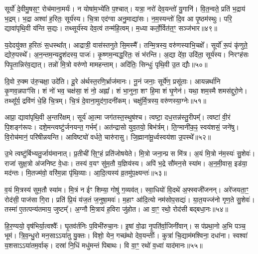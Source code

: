 सूर्यो॑ दे॒वीमु॒षस॒ꣳ॒ रोच॑माना॒मर्यः॑।
न योषा॑म॒भ्ये॑ति प॒श्चात्।
यत्रा॒ नरो॑ देव॒यन्तो॑ यु॒गानि॑।
वि॒त॒न्वते॒ प्रति॑ भ॒द्राय॑ भ॒द्रम्।
भ॒द्रा अश्वा॑ ह॒रितः॒ सूर्य॑स्य।
चि॒त्रा एद॑ग्वा अनु॒माद्या॑सः।
न॒म॒स्यन्तो॑ दि॒व आ पृ॒ष्ठम॑स्थुः।
परि॒ द्यावा॑पृथि॒वी य॑न्ति स॒द्यः।
तथ्सूर्य॑स्य देव॒त्वं तन्म॑हि॒त्वम्।
म॒ध्या कर्तो॒र्वित॑त॒ꣳ॒ सञ्ज॑भार॥४९॥

य॒देदयु॑क्त ह॒रितः॑ स॒धस्था᳚त्।
आद्रात्री॒ वास॑स्तनुते सि॒मस्मै᳚।
तन्मि॒त्रस्य॒ वरु॑णस्याभि॒चक्षे᳚।
सूर्यो॑ रू॒पं कृ॑णुते॒ द्योरु॒पस्थे᳚।
अ॒न॒न्तम॒न्यद्रुश॑दस्य॒ पाजः॑।
कृ॒ष्णम॒न्यद्ध॒रितः॒ सं भ॑रन्ति।
अ॒द्या दे॑वा॒ उदि॑ता॒ सूर्य॑स्य।
निरꣳह॑सः पिपृ॒तान्निर॑व॒द्यात्।
तन्नो॑ मि॒त्रो वरु॑णो मामहन्ताम्।
अदि॑तिः॒ सिन्धुः॑ पृथि॒वी उ॒त द्यौः॥५०॥

दि॒वो रु॒क्म उ॑रु॒चक्षा॒ उदे॑ति।
दू॒रे अ॑र्थस्त॒रणि॒र्भ्राज॑मानः।
नू॒नं जनाः॒ सूर्ये॑ण॒ प्रसू॑ताः।
आयन्नर्था॑नि कृ॒णव॒न्नपाꣳ॑सि।
शं नो॑ भव॒ चक्ष॑सा॒ शं नो॒ अह्ना᳚।
शं भा॒नुना॒ शꣳ हि॒मा शं घृ॒णेन॑।
यथा॒ शम॒स्मै शमस॑द्दुरो॒णे।
तथ्सू᳚र्य॒ द्रवि॑णं धे॒हि चि॒त्रम्।
चि॒त्रं दे॒वाना॒मुद॑गा॒दनी॑कम्।
चक्षु॑र्मि॒त्रस्य॒ वरु॑णस्या॒ग्नेः॥५१॥

आप्रा॒ द्यावा॑पृथि॒वी अ॒न्तरि॑क्षम्।
सूर्य॑ आ॒त्मा जग॑तस्त॒स्थुष॑श्च।
त्वष्टा॒ दध॒त्तन्न॑स्तु॒रीपम्᳚।
त्वष्टा॑ वी॒रं पि॒शङ्ग॑रूपः।
दशे॒मन्त्वष्टु॑र्जनयन्त॒ गर्भम्᳚।
अत॑न्द्रासो युव॒तयो॒ बिभ॑र्त्रम्।
ति॒ग्मानी॑क॒ꣴ॒ स्वय॑शसं॒ जने॑षु।
वि॒रोच॑मानं॒ परि॑षीन्नयन्ति।
आविष्ट्यो॑ वर्धते॒ चारु॑रासु।
जि॒ह्माना॑मू॒र्ध्वस्वय॑शा उ॒पस्थे᳚॥५२॥

उ॒भे त्वष्टु॑र्बिभ्यतु॒र्जाय॑मानात्।
प्र॒तीची॑ सि॒ꣳ॒हं प्रति॑\-जोषयेते।
मि॒त्रो जना॒न्प्र स मि॑त्र।
अ॒यं मि॒त्रो न॑म॒स्यः॑ सु॒शेवः॑।
राजा॑ सुक्ष॒त्रो अ॑जनिष्ट वे॒धाः।
तस्य॑ व॒यꣳ सु॑म॒तौ य॒ज्ञिय॑स्य।
अपि॑ भ॒द्रे सौ॑मन॒से स्या॑म।
अ॒न॒मी॒वास॒ इड॑या॒ मद॑न्तः।
मि॒तज्म॑वो॒ वरि॑म॒न्ना पृ॑थि॒व्याः।
आ॒दि॒त्यस्य॑ व्र॒तमु॑प॒क्ष्यन्तः॑॥५३॥

व॒यं मि॒त्रस्य॑ सुम॒तौ स्या॑म।
मि॒त्रं न ईꣳ शिम्या॒ गोषु॑ ग॒व्यव॑त्।
स्वा॒धियो॑ वि॒दथे॑ अ॒फ्स्वजी॑जनन्।
अरे॑जयता॒ꣳ॒ रोद॑सी॒ पाज॑सा गि॒रा।
प्रति॑ प्रि॒यं य॑ज॒तं ज॒नुषा॒मवः॑।
म॒हाꣳ आ॑दि॒त्यो नम॑सोप॒सद्यः॑।
या॒त॒यज्ज॑नो गृण॒ते सु॒शेवः॑।
तस्मा॑ ए॒तत्पन्य॑तमाय॒ जुष्टम्᳚।
अ॒ग्नौ मि॒त्राय॑ ह॒विरा जु॑होत।
आ वा॒ꣳ॒ रथो॒ रोद॑सी बद्बधा॒नः॥५४॥

हि॒र॒ण्ययो॒ वृष॑भिर्या॒त्वश्वैः᳚।
घृ॒तव॑र्तनिः प॒विभी॑रुचा॒नः।
इ॒षां वो॒ढा नृ॒पति॑र्वा॒जिनी॑वान्।
स प॑प्रथा॒नो अ॒भि पञ्च॒ भूम॑।
त्रि॒व॒न्धु॒रो मन॒साऽऽया॑तु यु॒क्तः।
विशो॒ येन॒ गच्छ॑थो देव॒यन्तीः᳚।
कुत्रा॑ चि॒द्याम॑मश्विना॒ दधा॑ना।
स्वश्वा॑ य॒शसा\-ऽऽया॑तम॒र्वाक्।
दस्रा॑ नि॒धिं मधु॑मन्तं पिबाथः।
वि वा॒ꣳ॒ रथो॑ व॒ध्वा॑ याद॑मानः॥५५॥

